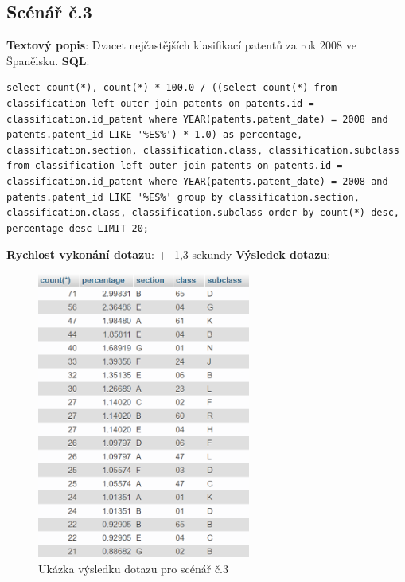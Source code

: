 \subsection{Scénář č.3}
\textbf{Textový popis}: Dvacet nejčastějších klasifikací patentů za rok 2008 ve Španělsku.
\newline
\textbf{SQL}:
\begin{lstlisting}[label = {lst:elements_a}]
select count(*), count(*) * 100.0 / ((select count(*) from classification left outer join patents on patents.id = classification.id_patent where YEAR(patents.patent_date) = 2008 and patents.patent_id LIKE '%ES%') * 1.0) as percentage, classification.section, classification.class, classification.subclass from classification left outer join patents on patents.id = classification.id_patent where YEAR(patents.patent_date) = 2008 and patents.patent_id LIKE '%ES%' group by classification.section, classification.class, classification.subclass order by count(*) desc, percentage desc LIMIT 20;
\end{lstlisting}
\textbf{Rychlost vykonání dotazu}: +- 1,3 sekundy
\newline
\textbf{Výsledek dotazu}:
\begin{figure}[H]
\centering
\includegraphics[width=7cm]{img/scenare/scenar_3}
\caption{Ukázka výsledku dotazu pro scénář č.3}
\label{fig:scenar3}
\end{figure}

